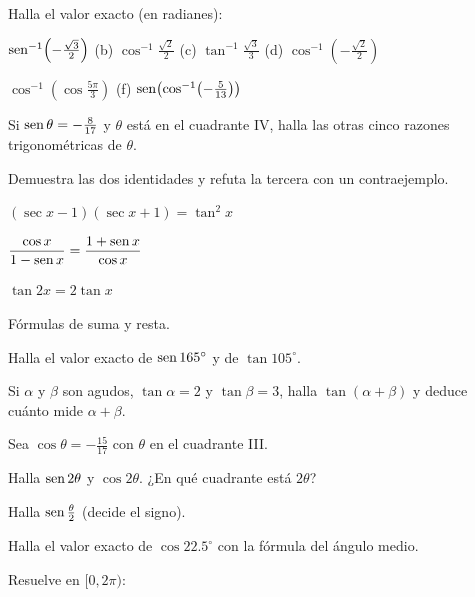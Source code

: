 \documentclass[11pt,a4paper]{article}
\begin{document}
\taller
\begin{ejercicios}
\item Halla el valor exacto (en radianes):
  \begin{ejercicios}
  \item $\operatorname{sen}^{-1}\!\left(-\tfrac{\sqrt3}{2}\right)$ \quad (b) $\cos^{-1}\tfrac{\sqrt2}{2}$ \quad (c) $\tan^{-1}\tfrac{\sqrt3}{3}$ \quad (d) $\cos^{-1}\!\left(-\tfrac{\sqrt2}{2}\right)$
  \setcounter{ejerciciosii}{4}
  \item $\cos^{-1}\!\left(\cos\tfrac{5\pi}{3}\right)$ \quad (f) $\operatorname{sen}\!\left(\cos^{-1}\!\left(-\tfrac{5}{13}\right)\right)$
  \end{ejercicios}
\item Si $\operatorname{sen}\theta=-\tfrac{8}{17}$ y $\theta$ está en el cuadrante IV, halla las otras cinco razones trigonométricas de $\theta$.
\item Demuestra las dos identidades y refuta la tercera con un contraejemplo.
  \begin{ejercicios}
  \item $(\sec x-1)(\sec x+1)=\tan^2x$
  \item $\dfrac{\cos x}{1-\operatorname{sen} x}=\dfrac{1+\operatorname{sen} x}{\cos x}$
  \item $\tan2x=2\tan x$
  \end{ejercicios}
\item Fórmulas de suma y resta.
  \begin{ejercicios}
  \item Halla el valor exacto de $\operatorname{sen}165^\circ$ y de $\tan105^\circ$.
  \item Si $\alpha$ y $\beta$ son agudos, $\tan\alpha=2$ y $\tan\beta=3$, halla $\tan(\alpha+\beta)$ y deduce cuánto mide $\alpha+\beta$.
  \end{ejercicios}
\item Sea $\cos\theta=-\tfrac{15}{17}$ con $\theta$ en el cuadrante III.
  \begin{ejercicios}
  \item Halla $\operatorname{sen}2\theta$ y $\cos2\theta$. ¿En qué cuadrante está $2\theta$?
  \item Halla $\operatorname{sen}\tfrac{\theta}{2}$ (decide el signo).
  \item Halla el valor exacto de $\cos22.5^\circ$ con la fórmula del ángulo medio.
  \end{ejercicios}
\item Resuelve en $[0,2\pi)$:
  \begin{ejercicios}

\end{ejercicios}
\end{ejercicios}
\end{document}
